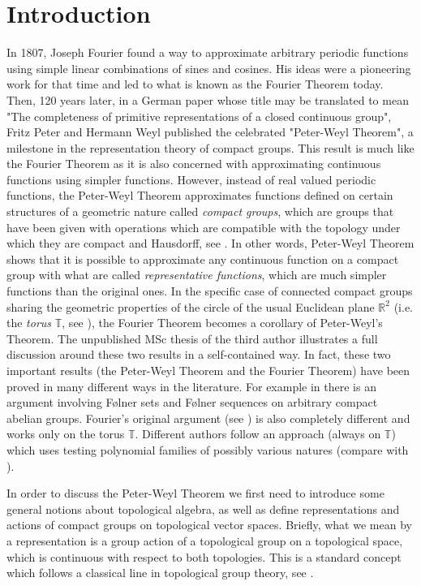 \documentclass{amsart}
\theoremstyle{definition}
\numberwithin{equation}{section}
\newcommand{\R}{\mathbb{R}}
\newcommand{\T}{\mathbb{T}}
\begin{document}
\section{Introduction}\label{1}



In 1807, Joseph Fourier found a way to approximate arbitrary periodic functions using simple linear combinations of sines and cosines. His ideas were a pioneering work for that time and led to what is known as the Fourier Theorem today. Then, 120 years later, in a German paper whose title may be translated to mean "The completeness of primitive representations of a closed continuous group", Fritz Peter and Hermann Weyl \cite{pw} published the celebrated "Peter-Weyl Theorem", a milestone in the representation theory of compact groups. This result is much like the Fourier Theorem as it is also concerned with approximating continuous functions using simpler functions. However, instead of real valued periodic functions, the Peter-Weyl Theorem approximates functions defined on certain structures of a geometric nature called \textit{compact groups}, which are groups that have been given with operations which are compatible with the topology under which they are compact and Hausdorff, see \cite{HewittRoss, hilgertneeb, hm, stroppel}. In other words, Peter-Weyl Theorem shows that it is possible to approximate any continuous function on a compact group with what are called \textit{representative functions}, which are much simpler functions than the original ones. In the specific case of  connected compact groups sharing the geometric properties of the circle of the usual Euclidean plane $\R^2$ (i.e. the \textit{torus} $\T$, see \cite{hm}), the Fourier Theorem becomes a corollary of Peter-Weyl's Theorem. The unpublished MSc thesis of the third author \cite{ste}  illustrates a full discussion around these two results in a self-contained way. In fact, these two important results (the Peter-Weyl Theorem and the Fourier Theorem) have been proved in many different ways in the literature. For example in \cite[\S 11.5]{lda} there is an argument involving Følner sets and Følner sequences on arbitrary compact abelian groups. Fourier's original argument (see \cite[Section 1.5]{enrique}) is also completely different and works only on the torus $\mathbb{T}$. Different authors \cite{FMS} follow an approach (always on $\mathbb{T}$) which uses testing polynomial families of possibly various natures (compare with \cite[4.26 Fourier Series]{rudin}). 

In order to discuss the Peter-Weyl Theorem we first need to introduce some general notions about topological algebra, as well as define representations and actions of compact groups on topological vector spaces. Briefly, what we mean by a representation is a group action of a topological group on a topological space, which is continuous with respect to both topologies. This is a standard concept which follows a classical line in topological group theory, see \cite{HewittRoss, hilgertneeb, hm, hofmann, stroppel}.
\end{document}
